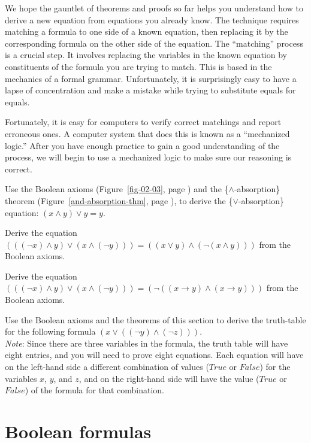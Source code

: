 We hope the gauntlet of theorems and proofs so far
helps you understand how to derive a new equation from equations you already know.
The technique requires matching a formula to one side of a known equation,
then replacing it by the corresponding formula on the other side
of the equation.
The
``matching'' process is a crucial step.
It involves replacing the variables in the known equation
by constituents of the formula you are trying to match.
This is based in the mechanics of a formal grammar.
Unfortunately, it is surprisingly easy
to have a lapse of concentration and make a mistake
while trying to substitute equals for equals.

Fortunately, it is easy for computers to verify
correct matchings and report erroneous ones.
A computer system that does this is known as a ``mechanized logic.''
After you have enough practice to gain a good understanding of the process,
we will begin to use a mechanized logic to make sure our reasoning is correct.

\begin{ExerciseList}
\Exercise
Use the Boolean axioms (Figure~\ref{fig-02-03}, page \pageref{fig-02-03})
and the \{$\wedge$-absorption\} theorem
(Figure~\ref{and-absorption-thm}, page \pageref{and-absorption-thm}),
to derive the \{$\vee$-absorption\} equation: $(x \wedge y) \vee y = y$.

\Exercise
Derive the equation
$(((\neg x) \wedge y) \vee (x \wedge (\neg y))) = ((x \vee y) \wedge (\neg(x \wedge y)))$
from the Boolean axioms.

\Exercise
Derive the equation
$(((\neg x) \wedge y) \vee (x \wedge (\neg y))) = (\neg((x \rightarrow y) \wedge (x \rightarrow y)))$
from the Boolean axioms.

\Exercise
Use the Boolean axioms
and the theorems of this section to
derive the truth-table for the following formula $(x \vee ((\neg y) \wedge (\neg z)))$.\\
\emph{Note}: Since there are three variables in the formula, the truth table
will have eight entries, and you will need to prove eight equations.
Each equation will have on the left-hand side
a different combination of values ($True$ or $False$) for the variables $x$, $y$, and $z$,
and on the right-hand side will have the value ($True$ or $False$) of the formula for that combination.
\end{ExerciseList}

\section{Boolean formulas}
\label{sec:boolean-formuas}

